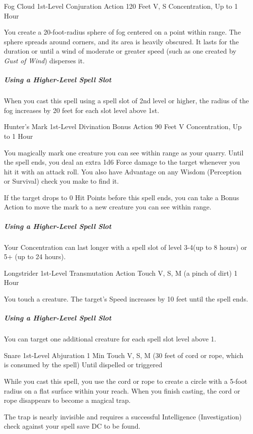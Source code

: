 \documentclass[letterpaper,openany,oneside,twocolumn]{book}
\begin{document}
\DndSpellHeader
  {Fog Cloud}
  {1st-Level Conjuration}
  {Action}
  {120 Feet}
  {V, S}
  {Concentration, Up to 1 Hour}

You create a 20-foot-radius sphere of fog centered on a point within range. The sphere spreads around corners, and its area is heavily obscured. It lasts for the duration or until a wind of moderate or greater speed (such as one created by \textit{Gust of Wind}) disperses it.

\subparagraph*{Using a Higher-Level Spell Slot} When you cast this spell using a spell slot of 2nd level or higher, the radius of the fog increases by 20 feet for each slot level above 1st.

\DndSpellHeader
  {Hunter's Mark}
  {1st-Level Divination}
  {Bonus Action}
  {90 Feet}
  {V}
  {Concentration, Up to 1 Hour}

You magically mark one creature you can see within range as your quarry. Until the spell ends, you deal an extra 1d6 Force damage to the target whenever you hit it with an attack roll. You also have Advantage on any Wisdom (Perception or Survival) check you make to find it.

If the target drops to 0 Hit Points before this spell ends, you can take a Bonus Action to move the mark to a new creature you can see within range.

\subparagraph*{Using a Higher-Level Spell Slot} Your Concentration can last longer with a spell slot of level 3-4(up to 8 hours) or 5+ (up to 24 hours).

\DndSpellHeader
  {Longstrider}
  {1st-Level Transmutation}
  {Action}
  {Touch}
  {V, S, M (a pinch of dirt)}
  {1 Hour}

You touch a creature. The target's Speed increases by 10 feet until the spell ends.

\subparagraph*{Using a Higher-Level Spell Slot} You can target one additional creature for each spell slot level above 1.

\DndSpellHeader
  {Snare}
  {1st-Level Abjuration}
  {1 Min}
  {Touch}
  {V, S, M (30 feet of cord or rope, which is consumed by the spell)}
  {Until dispelled or triggered}

While you cast this spell, you use the cord or rope to create a circle with a 5-foot radius on a flat surface within your reach. When you finish casting, the cord or rope disappears to become a magical trap.

The trap is nearly invisible and requires a successful Intelligence (Investigation) check against your spell save DC to be found.
\end{document}
